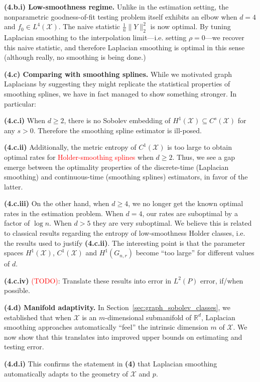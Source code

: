 \documentclass{article}
\newcommand{\Reals}{\mathbb{R}}
\newcommand{\1}{\mathbf{1}}
\newcommand{\Xset}{\mathcal{X}}
\newcommand{\Leb}{L}
\theoremstyle{alden}
\theoremstyle{aldenthm}
\theoremstyle{definition}
\theoremstyle{remark}
\begin{document}
\quad \textbf{(4.b.i) Low-smoothness regime.} Unlike in the estimation setting, the nonparametric goodness-of-fit testing problem itself exhibits an elbow when $d = 4$ and $f_0 \in \Leb^4(\Xset)$. The naive statistic $\frac{1}{n}\|Y\|_2^2$ is now optimal. By tuning Laplacian smoothing to the interpolation limit---i.e. setting $\rho = 0$---we recover this naive statistic, and therefore Laplacian smoothing is optimal in this sense (although really, no smoothing is being done.)

\textbf{(4.c) Comparing with smoothing splines.} While we motivated graph Laplacians by suggesting they might replicate the statistical properties of smoothing splines, we have in fact managed to show something stronger. In particular:

\quad \textbf{(4.c.i)} When $d \geq 2$, there is no Sobolev embedding of $H^1(\Xset) \subseteq C^s(\Xset)$ for any $s > 0$. Therefore the smoothing spline estimator is ill-posed.

\quad \textbf{(4.c.ii)} Additionally, the metric entropy of $C^1(\Xset)$ is too large to obtain optimal rates for \textcolor{red}{Holder-smoothing splines} when $d \geq 2$. Thus, we see a gap emerge between the optimality properties of the discrete-time (Laplacian smoothing) and continuous-time (smoothing splines) estimators, in favor of the latter.

\quad \textbf{(4.c.iii)} On the other hand, when $d \geq 4$, we no longer get the known optimal rates in the estimation problem. When $d = 4$, our rates are suboptimal by a factor of $\log n$. When $d > 5$ they are very suboptimal. We believe this is related to classical results regarding the entropy of low-smoothness Holder classes, i.e. the results used to justify \textbf{(4.c.ii)}. The interesting point is that the parameter spaces $H^1(\Xset)$, $C^1(\Xset)$ and $H^1(G_{n,r})$ become ``too large'' for different values of $d$.
 
\quad \textbf{(4.c.iv)} \textcolor{red}{(TODO)}: Translate these results into error in $\Leb^2(P)$ error, if/when possible. 

\textbf{(4.d) Manifold adaptivity.} In Section~\ref{sec:graph_sobolev_classes}, we established that when $\Xset$ is an $m$-dimensional submanifold of $\Reals^d$, Laplacian smoothing approaches automatically ``feel'' the intrinsic dimension $m$ of $\Xset$. We now show that this translates into improved upper bounds on estimating and testing error.

\quad \textbf{(4.d.i)} This confirms the statement in \textbf{(4)} that Laplacian smoothing automatically adapts to the geometry of $\Xset$ and $p$. 
\end{document}
